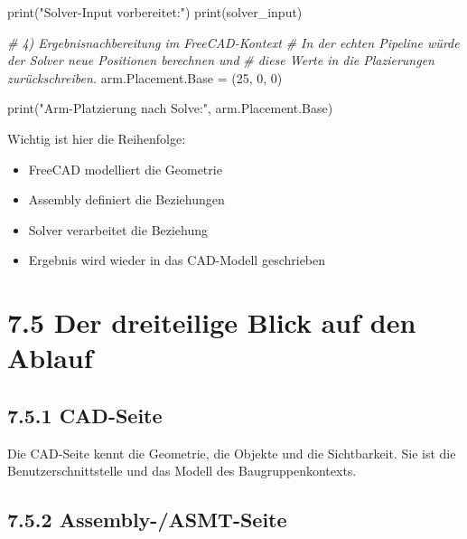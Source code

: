 \documentclass[
  12pt
]{book}
\newenvironment{Shaded}{}{}
\newcommand{\BuiltInTok}[1]{\textcolor[rgb]{0.00,0.50,0.00}{#1}}
\newcommand{\CommentTok}[1]{\textcolor[rgb]{0.38,0.63,0.69}{\textit{#1}}}
\newcommand{\DecValTok}[1]{\textcolor[rgb]{0.25,0.63,0.44}{#1}}
\newcommand{\NormalTok}[1]{#1}
\newcommand{\OperatorTok}[1]{\textcolor[rgb]{0.40,0.40,0.40}{#1}}
\newcommand{\StringTok}[1]{\textcolor[rgb]{0.25,0.44,0.63}{#1}}
\providecommand{\tightlist}{%
  \setlength{\itemsep}{0pt}\setlength{\parskip}{0pt}}
\begin{document}
\begin{Shaded}
\begin{Highlighting}[]
\BuiltInTok{print}\NormalTok{(}\StringTok{"Solver{-}Input vorbereitet:"}\NormalTok{)}
\BuiltInTok{print}\NormalTok{(solver\_input)}

\CommentTok{\# 4) Ergebnisnachbereitung im FreeCAD{-}Kontext}
\CommentTok{\# In der echten Pipeline würde der Solver neue Positionen berechnen und}
\CommentTok{\# diese Werte in die Plazierungen zurückschreiben.}
\NormalTok{arm.Placement.Base }\OperatorTok{=}\NormalTok{ (}\DecValTok{25}\NormalTok{, }\DecValTok{0}\NormalTok{, }\DecValTok{0}\NormalTok{)}

\BuiltInTok{print}\NormalTok{(}\StringTok{"Arm{-}Platzierung nach Solve:"}\NormalTok{, arm.Placement.Base)}
\end{Highlighting}
\end{Shaded}

Wichtig ist hier die Reihenfolge:

\begin{itemize}
\tightlist
\item
  FreeCAD modelliert die Geometrie
\item
  Assembly definiert die Beziehungen
\item
  Solver verarbeitet die Beziehung
\item
  Ergebnis wird wieder in das CAD-Modell geschrieben
\end{itemize}

\hypertarget{der-dreiteilige-blick-auf-den-ablauf}{%
\section{\texorpdfstring{{7.5} Der dreiteilige Blick auf den
Ablauf}{7.5 Der dreiteilige Blick auf den Ablauf}}\label{der-dreiteilige-blick-auf-den-ablauf}}

\hypertarget{cad-seite}{%
\subsection{\texorpdfstring{{7.5.1}
CAD-Seite}{7.5.1 CAD-Seite}}\label{cad-seite}}

Die CAD-Seite kennt die Geometrie, die Objekte und die Sichtbarkeit. Sie
ist die Benutzerschnittstelle und das Modell des Baugruppenkontexts.

\hypertarget{assembly-asmt-seite}{%
\subsection{\texorpdfstring{{7.5.2}
Assembly-/ASMT-Seite}{7.5.2 Assembly-/ASMT-Seite}}\label{assembly-asmt-seite}}
\end{document}

